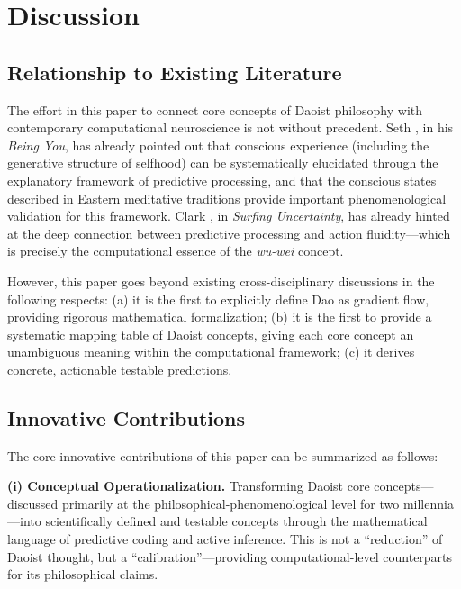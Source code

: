 \documentclass[11pt,a4paper]{article}
\begin{document}
\section{Discussion}

\subsection{Relationship to Existing Literature}

The effort in this paper to connect core concepts of Daoist philosophy with contemporary computational neuroscience is not without precedent. Seth \cite{Seth2021}, in his \textit{Being You}, has already pointed out that conscious experience (including the generative structure of selfhood) can be systematically elucidated through the explanatory framework of predictive processing, and that the conscious states described in Eastern meditative traditions provide important phenomenological validation for this framework. Clark \cite{Clark2015}, in \textit{Surfing Uncertainty}, has already hinted at the deep connection between predictive processing and action fluidity---which is precisely the computational essence of the \textit{wu-wei} concept.

However, this paper goes beyond existing cross-disciplinary discussions in the following respects: (a) it is the first to explicitly define Dao as gradient flow, providing rigorous mathematical formalization; (b) it is the first to provide a systematic mapping table of Daoist concepts, giving each core concept an unambiguous meaning within the computational framework; (c) it derives concrete, actionable testable predictions.

\subsection{Innovative Contributions}

The core innovative contributions of this paper can be summarized as follows:

\textbf{(i) Conceptual Operationalization.} Transforming Daoist core concepts---discussed primarily at the philosophical-phenomenological level for two millennia---into scientifically defined and testable concepts through the mathematical language of predictive coding and active inference. This is not a ``reduction'' of Daoist thought, but a ``calibration''---providing computational-level counterparts for its philosophical claims.
\end{document}
